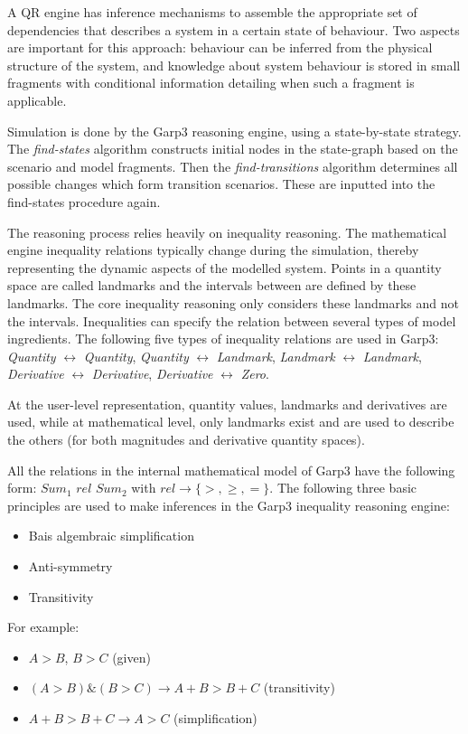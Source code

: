 \documentclass{article} %
\begin{document}
A QR engine has inference mechanisms to assemble the appropriate set of
dependencies that describes a system in a certain state of behaviour. Two
aspects are important for this approach: behaviour can be inferred from the
physical structure of the system, and knowledge about system behaviour is
stored in small fragments with conditional information detailing when such a
fragment is applicable.

\vspace{0.8em}

Simulation is done by the Garp3 reasoning engine, using a state-by-state
strategy. The \emph{find-states} algorithm constructs initial nodes in the 
state-graph based on the scenario and model fragments. Then the 
\emph{find-transitions} algorithm determines all possible changes which form 
transition scenarios. These are inputted into the find-states procedure again.  

The reasoning process relies heavily on inequality reasoning.
The mathematical engine inequality relations typically change during the 
simulation, thereby representing the dynamic aspects of the modelled system. 
Points in a quantity 
space are called landmarks and the intervals between are defined by these
landmarks. The core inequality reasoning only considers these landmarks and not
the intervals. Inequalities can specify the relation between several types of
model ingredients. The following five types of inequality relations are used in
Garp3: \emph{Quantity} $\leftrightarrow$ \emph{Quantity}, \emph{Quantity} 
$\leftrightarrow$ \emph{Landmark}, \emph{Landmark} $\leftrightarrow$ 
\emph{Landmark}, \emph{Derivative} $\leftrightarrow$ \emph{Derivative}, 
\emph{Derivative} $\leftrightarrow$ \emph{Zero}.  

At the user-level representation, quantity values, landmarks and derivatives are
used, while at mathematical level, only landmarks exist and are used to
describe the others (for both magnitudes and derivative quantity spaces).

All the relations in the internal mathematical model of Garp3 have the
following form: $Sum_1$ $rel$ $Sum_2$ with $rel \rightarrow \{>,\ge,=\}$. The following
three basic principles are used to make inferences in the Garp3 inequality
reasoning engine:

\begin{itemize}
\item Bais algembraic simplification
\item Anti-symmetry
\item Transitivity
\end{itemize}
For example:
\begin{itemize}
\item $A>B$, $B>C$ (given)
\item $(A>B)\&(B>C) \rightarrow A+B>B+C$ (transitivity)
\item $A+B>B+C \rightarrow A>C$ (simplification)
\end{itemize}
\end{document}
